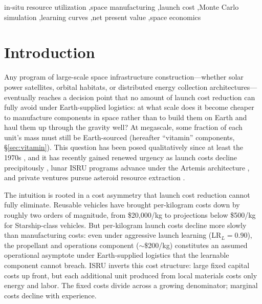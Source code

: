 \documentclass[preprint,12pt]{elsarticle}
\begin{document}
\begin{frontmatter}
\begin{keyword}
in-situ resource utilization \sep space manufacturing \sep launch cost \sep Monte Carlo simulation \sep learning curves \sep net present value \sep space economics
\end{keyword}

\end{frontmatter}

\linenumbers

\section{Introduction}
\label{sec:introduction}

Any program of large-scale space infrastructure construction---whether solar power satellites, orbital habitats, or distributed energy collection architectures---eventually reaches a decision point that no amount of launch cost reduction can fully avoid under Earth-supplied logistics: at what scale does it become cheaper to manufacture components in space rather than to build them on Earth and haul them up through the gravity well? At megascale, some fraction of each unit's mass must still be Earth-sourced (hereafter ``vitamin'' components, \S\ref{sec:vitamin}). This question has been posed qualitatively since at least the 1970s \cite{oneill1974,oneill1976}, and it has recently gained renewed urgency as launch costs decline precipitously \cite{jones2018}, lunar ISRU programs advance under the Artemis architecture \cite{sanders2015}, and private ventures pursue asteroid resource extraction \cite{elvis2012,andrews2015}.

The intuition is rooted in a cost asymmetry that launch cost reduction cannot fully eliminate. Reusable vehicles have brought per-kilogram costs down by roughly two orders of magnitude, from \$20{,}000/kg to projections below \$500/kg for Starship-class vehicles. But per-kilogram launch costs decline more slowly than manufacturing costs: even under aggressive launch learning (LR$_L = 0.90$), the propellant and operations component ($\sim$\$200/kg) constitutes an assumed operational asymptote under Earth-supplied logistics that the learnable component cannot breach. ISRU inverts this cost structure: large fixed capital costs up front, but each additional unit produced from local materials costs only energy and labor. The fixed costs divide across a growing denominator; marginal costs decline with experience.
\end{document}
